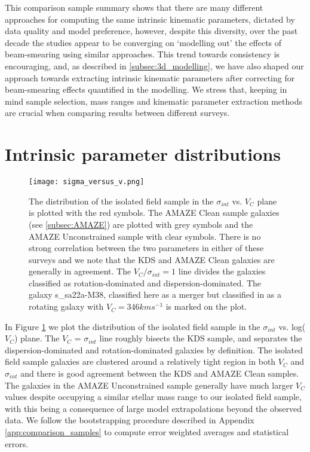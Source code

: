 \documentclass[fleqn,usenatbib]{mn2e}
\begin{document}
This comparison sample summary shows that there are many different approaches for computing the same intrinsic kinematic parameters, dictated by data quality and model preference, however, despite this diversity, over the past decade the studies appear to be converging on `modelling out' the effects of beam-smearing using similar approaches.
This trend towards consistency is encouraging, and, as described in \cref{subsec:3d_modelling}, we have also shaped our approach towards extracting intrinsic kinematic parameters after correcting for beam-smearing effects quantified in the modelling.
We stress that, keeping in mind sample selection, mass ranges and kinematic parameter extraction methods are crucial when comparing results between different surveys.

\section{Intrinsic parameter distributions}

\begin{figure}
\centering \hspace{-1.13cm}
\texttt{[image: sigma\_versus\_v.png]}
\caption{The distribution of the isolated field sample in the $\sigma_{int}$ vs. $V_{C}$ plane is plotted with the red symbols.
The AMAZE Clean sample galaxies (see \protect\cref{subsec:AMAZE}) are plotted with grey symbols and the AMAZE Unconstrained sample with clear symbols.    There is no strong correlation between the two parameters in either of these surveys and we note that the KDS and AMAZE Clean galaxies are generally in agreement.
The $V_{C}/\sigma_{int} = 1$ line divides the galaxies classified as rotation-dominated and dispersion-dominated.
The galaxy s\_sa22a-M38, classified here as a merger but classified in \protect\cite{Gnerucci2011} as a rotating galaxy with $V_{C} = 346 kms^{-1}$ is marked on the plot.}
\label{fig:intrinsic_parameters}
\end{figure}

In Figure \ref{fig:intrinsic_parameters} we plot the distribution of the isolated field sample in the $\sigma_{int}$ vs. log($V_{C}$) plane. 
The $V_{C}$ = $\sigma_{int}$ line roughly bisects the KDS sample, and separates the dispersion-dominated and rotation-dominated galaxies by definition.
The isolated field sample galaxies are clustered around a relatively tight region in both $V_{C}$ and $\sigma_{int}$ and there is good agreement between the KDS and AMAZE Clean samples.
The galaxies in the AMAZE Unconstrained sample generally have much larger $V_{C}$ values despite occupying a similar stellar mass range to our isolated field sample, with this being a consequence of large model extrapolations beyond the observed data.
We follow the bootstrapping procedure described in Appendix \ref{app:comparison_samples} to compute error weighted averages and statistical errors.
\end{document}
